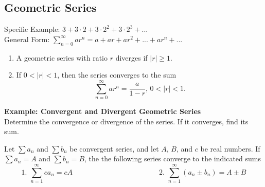 \subsection*{Geometric Series}
Specific Example: $3+3\cdot2+3\cdot2^2+3\cdot2^3+...$\\
General Form: $\displaystyle\sum_{n=0}^{\infty}ar^n=a+ar+ar^2+...+ar^n+...$

\begin{tcolorbox}[title= CONVERGENCE OF A GEOMETRIC SERIES,colframe=black,sharp corners,colback=white,colbacktitle=white,coltitle=black]

    \begin{enumerate}
        \item A geometric series with ratio $r$ diverges if $|r|\ge1$.
        \item If $0<|r|<1$, then the series converges to the sum
        \[\displaystyle\sum_{n=0}^{\infty}ar^n=\frac{a}{1-r},\, 0<|r|<1.\]
    \end{enumerate}

\end{tcolorbox}
\vspace{.1in}

\noindent\textbf{Example: Convergent and Divergent Geometric Series}\\
Determine the convergence or divergence of the series. If it converges, find its sum.

\begin{tcolorbox}[title= PROPERTIES OF INFINITE SERIES,colframe=black,sharp corners,colback=white,colbacktitle=white,coltitle=black]

    Let $\displaystyle\sum a_n$ and $\displaystyle\sum b_n$ be convergent series, and let $A$, $B$, and $c$ be real numbers. If $\displaystyle\sum a_n=A$ and $\displaystyle\sum b_n=B$, the the following series converge to the indicated sums
    \[1.\, \, \sum_{n=1}^{\infty}ca_n=cA \hspace{2in}2.\, \, \sum_{n=1}^{\infty}\left(a_n\pm b_n\right)=A\pm B\]

\end{tcolorbox}

\newpage
